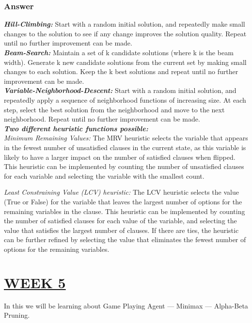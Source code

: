 \documentclass[15pt,journal]{IEEEtran}
\begin{document}
\subsubsection{\Large{\textbf{Answer}}\\}
\textbf{\textit{\cite{hill}Hill-Climbing:}} Start with a random initial solution, and repeatedly make small changes to the solution to see if any change improves the solution quality. Repeat until no further improvement can be made. \\
\textbf{\textit{\cite{hill}Beam-Search:}} Maintain a set of k candidate solutions (where k is the beam width). Generate k new candidate solutions from the current set by making small changes to each solution. Keep the k best solutions and repeat until no further improvement can be made. \\
\textbf{\textit{\cite{hill}Variable-Neighborhood-Descent:}} Start with a random initial solution, and repeatedly apply a sequence of neighborhood functions of increasing size. At each step, select the best solution from the neighborhood and move to the next neighborhood. Repeat until no further improvement can be made. \\
\textbf{\textit{Two different heuristic functions possible:}} \\
\textit{Minimum Remaining Values:}
The MRV heuristic selects the variable that appears in the fewest number of unsatisfied clauses in the current state, as this variable is likely to have a larger impact on the number of satisfied clauses when flipped. This heuristic can be implemented by counting the number of unsatisfied clauses for each variable and selecting the variable with the smallest count.

\textit{Least Constraining Value (LCV) heuristic:}
The LCV heuristic selects the value (True or False) for the variable that leaves the largest number of options for the remaining variables in the clause. This heuristic can be implemented by counting the number of satisfied clauses for each value of the variable, and selecting the value that satisfies the largest number of clauses. If there are ties, the heuristic can be further refined by selecting the value that eliminates the fewest number of options for the remaining variables.

\section{\large{\underline{WEEK 5}}}
In this we will be learning about Game Playing Agent — Minimax — Alpha-Beta
Pruning. 
\end{document}
